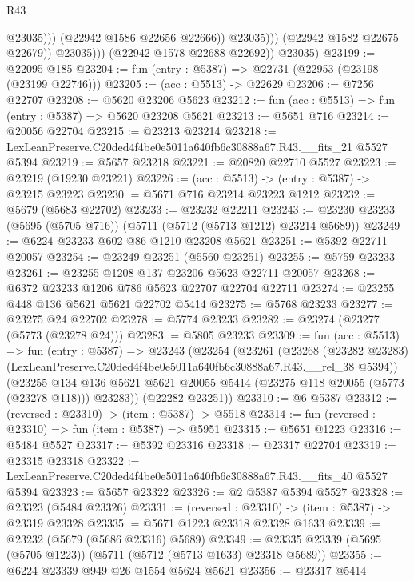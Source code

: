 \begin{lexlean}{R43}
\begin{coremodule}
                              @23035)))
                        (@22942 @1586 @22656 @22666))
                      @23035)))
                (@22942 @1582 @22675 @22679))
              @23035)))
        (@22942 @1578 @22688 @22692))
      @23035)
@23199 := @22095 @185
@23204 := fun (entry : @5387) => @22731 (@22953 (@23198 (@23199 @22746)))
@23205 := (acc : @5513) -> @22629
@23206 := @7256 @22707
@23208 := @5620 @23206 @5623
@23212 := fun (acc : @5513) => fun (entry : @5387) => @5620 @23208 @5621
@23213 := @5651 @716
@23214 := @20056 @22704
@23215 := @23213 @23214
@23218 := LexLeanPreserve.C20ded4f4be0e5011a640fb6c30888a67.R43.__fits_21 @5527 @5394
@23219 := @5657 @23218
@23221 := @20820 @22710 @5527
@23223 := @23219 (@19230 @23221)
@23226 := (acc : @5513) -> (entry : @5387) -> @23215 @23223
@23230 := @5671 @716 @23214 @23223 @1212
@23232 := @5679 (@5683 @22702)
@23233 := @23232 @22211
@23243 := @23230 @23233 (@5695 (@5705 @716)) (@5711 (@5712 (@5713 @1212) @23214 @5689))
@23249 := @6224 @23233 @602 @86 @1210 @23208 @5621
@23251 := @5392 @22711 @20057
@23254 := @23249 @23251 (@5560 @23251)
@23255 := @5759 @23233
@23261 := @23255 @1208 @137 @23206 @5623 @22711 @20057
@23268 := @6372 @23233 @1206 @786 @5623 @22707 @22704 @22711
@23274 := @23255 @448 @136 @5621 @5621 @22702 @5414
@23275 := @5768 @23233
@23277 := @23275 @24 @22702
@23278 := @5774 @23233
@23282 := @23274 (@23277 (@5773 (@23278 @24)))
@23283 := @5805 @23233
@23309 := fun (acc : @5513) =>
  fun (entry : @5387) =>
  @23243
    (@23254
      (@23261
        (@23268
          (@23282 @23283)
          (LexLeanPreserve.C20ded4f4be0e5011a640fb6c30888a67.R43.__rel_38 @5394))
        (@23255
          @134
          @136
          @5621
          @5621
          @20055
          @5414
          (@23275 @118 @20055 (@5773 (@23278 @118)))
          @23283))
      (@22282 @23251))
@23310 := @6 @5387
@23312 := (reversed : @23310) -> (item : @5387) -> @5518
@23314 := fun (reversed : @23310) => fun (item : @5387) => @5951
@23315 := @5651 @1223
@23316 := @5484 @5527
@23317 := @5392 @23316
@23318 := @23317 @22704
@23319 := @23315 @23318
@23322 := LexLeanPreserve.C20ded4f4be0e5011a640fb6c30888a67.R43.__fits_40 @5527 @5394
@23323 := @5657 @23322
@23326 := @2 @5387 @5394 @5527
@23328 := @23323 (@5484 @23326)
@23331 := (reversed : @23310) -> (item : @5387) -> @23319 @23328
@23335 := @5671 @1223 @23318 @23328 @1633
@23339 := @23232 (@5679 (@5686 @23316) @5689)
@23349 := @23335 @23339 (@5695 (@5705 @1223)) (@5711 (@5712 (@5713 @1633) @23318 @5689))
@23355 := @6224 @23339 @949 @26 @1554 @5624 @5621
@23356 := @23317 @5414

\end{coremodule}
\end{lexlean}
